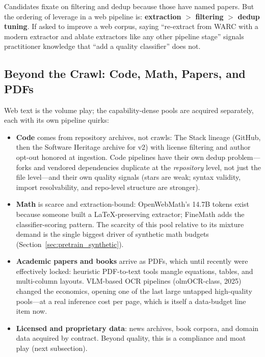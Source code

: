 \begin{keyinsight}
Candidates fixate on filtering and dedup because those have named papers. But the ordering of leverage in a web pipeline is: \textbf{extraction} $>$ \textbf{filtering} $>$ \textbf{dedup tuning}. If asked to improve a web corpus, saying ``re-extract from WARC with a modern extractor and ablate extractors like any other pipeline stage'' signals practitioner knowledge that ``add a quality classifier'' does not.
\end{keyinsight}

\subsection{Beyond the Crawl: Code, Math, Papers, and PDFs}

Web text is the volume play; the capability-dense pools are acquired separately, each with its own pipeline quirks:

\begin{itemize}
    \item \textbf{Code} comes from repository archives, not crawls: The Stack lineage (GitHub, then the Software Heritage archive for v2) with license filtering and author opt-out honored at ingestion. Code pipelines have their own dedup problem---forks and vendored dependencies duplicate at the \textit{repository} level, not just the file level---and their own quality signals (stars are weak; syntax validity, import resolvability, and repo-level structure are stronger).
    \item \textbf{Math} is scarce and extraction-bound: OpenWebMath's 14.7B tokens exist because someone built a LaTeX-preserving extractor; FineMath adds the classifier-scoring pattern. The scarcity of this pool relative to its mixture demand is the single biggest driver of synthetic math budgets (Section~\ref{sec:pretrain_synthetic}).
    \item \textbf{Academic papers and books} arrive as PDFs, which until recently were effectively locked: heuristic PDF-to-text tools mangle equations, tables, and multi-column layouts. VLM-based OCR pipelines (olmOCR-class, 2025) changed the economics, opening one of the last large untapped high-quality pools---at a real inference cost per page, which is itself a data-budget line item now.
    \item \textbf{Licensed and proprietary data}: news archives, book corpora, and domain data acquired by contract. Beyond quality, this is a compliance and moat play (next subsection).
\end{itemize}


